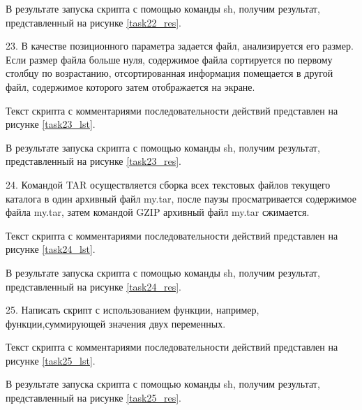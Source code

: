 
В результате запуска скрипта с помощью команды sh, получим результат, представленный на рисунке \ref{task22_res}.


23. В качестве позиционного параметра задается файл, анализируется его размер.  Если  размер  файла  больше  нуля,  содержимое  файла  сортируется  по первому столбцу по возрастанию, отсортированная информация помещается в другой файл, содержимое которого затем отображается на экране.

Текст скрипта с комментариями последовательности действий представлен на рисунке \ref{task23_lst}.


В результате запуска скрипта с помощью команды sh, получим результат, представленный на рисунке \ref{task23_res}.


24. Командой TAR осуществляется  сборка  всех  текстовых  файлов текущего каталога в один архивный файл my.tar, после паузы просматривается содержимое  файла my.tar,  затем  командой GZIP архивный  файл my.tar сжимается.

Текст скрипта с комментариями последовательности действий представлен на рисунке \ref{task24_lst}.


В результате запуска скрипта с помощью команды sh, получим результат, представленный на рисунке \ref{task24_res}.


25. Написать  скрипт  с  использованием  функции,  например,  функции,суммирующей значения двух переменных.

Текст скрипта с комментариями последовательности действий представлен на рисунке \ref{task25_lst}.


В результате запуска скрипта с помощью команды sh, получим результат, представленный на рисунке \ref{task25_res}.









